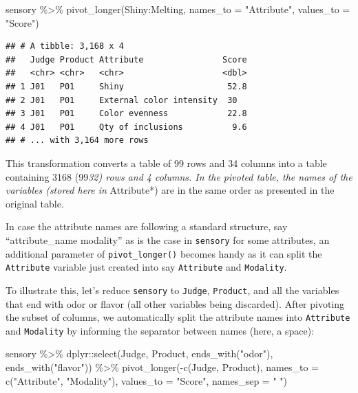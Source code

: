 \documentclass[
]{krantz}
\makeatletter
\newenvironment{Shaded}{\begin{snugshade}}{\end{snugshade}}
\newcommand{\AttributeTok}[1]{\textcolor[rgb]{0.61,0.61,0.61}{#1}}
\newcommand{\FunctionTok}[1]{\textcolor[rgb]{0,0,0}{#1}}
\newcommand{\NormalTok}[1]{#1}
\newcommand{\SpecialCharTok}[1]{\textcolor[rgb]{0,0,0}{#1}}
\newcommand{\StringTok}[1]{\textcolor[rgb]{0.5,0.5,0.5}{#1}}
\newenvironment{kframe}{%
\medskip{}
\setlength{\fboxsep}{.8em}
 \def\at@end@of@kframe{}%
 \ifinner\ifhmode%
  \def\at@end@of@kframe{\end{minipage}}%
  \begin{minipage}{\columnwidth}%
 \fi\fi%
 \def\FrameCommand##1{\hskip\@totalleftmargin \hskip-\fboxsep
 \colorbox{shadecolor}{##1}\hskip-\fboxsep
     \hskip-\linewidth \hskip-\@totalleftmargin \hskip\columnwidth}%
 \MakeFramed {\advance\hsize-\width
   \@totalleftmargin\z@ \linewidth\hsize
   \@setminipage}}%
 {\par\unskip\endMakeFramed%
 \at@end@of@kframe}
\renewenvironment{Shaded}{\begin{kframe}}{\end{kframe}}
\makeatother
\begin{document}
\begin{Shaded}
\begin{Highlighting}[]
\NormalTok{sensory }\SpecialCharTok{\%\textgreater{}\%}
  \FunctionTok{pivot\_longer}\NormalTok{(Shiny}\SpecialCharTok{:}\NormalTok{Melting, }
               \AttributeTok{names\_to =} \StringTok{"Attribute"}\NormalTok{, }\AttributeTok{values\_to =} \StringTok{"Score"}\NormalTok{)}
\end{Highlighting}
\end{Shaded}

\begin{verbatim}
## # A tibble: 3,168 x 4
##   Judge Product Attribute                Score
##   <chr> <chr>   <chr>                    <dbl>
## 1 J01   P01     Shiny                     52.8
## 2 J01   P01     External color intensity  30  
## 3 J01   P01     Color evenness            22.8
## 4 J01   P01     Qty of inclusions          9.6
## # ... with 3,164 more rows
\end{verbatim}

This transformation converts a table of 99 rows and 34 columns into a table containing 3168 (99\emph{32) rows and 4 columns.
In the pivoted table, the names of the variables (stored here in }Attribute*) are in the same order as presented in the original table.

In case the attribute names are following a standard structure, say ``attribute\_name modality'' as is the case in \texttt{sensory} for some attributes, an additional parameter of \texttt{pivot\_longer()} becomes handy as it can split the \texttt{Attribute} variable just created into say \texttt{Attribute} and \texttt{Modality}.

To illustrate this, let's reduce \texttt{sensory} to \texttt{Judge}, \texttt{Product}, and all the variables that end with odor or flavor (all other variables being discarded). After pivoting the subset of columns, we automatically split the attribute names into \texttt{Attribute} and \texttt{Modality} by informing the separator between names (here, a space):

\begin{Shaded}
\begin{Highlighting}[]
\NormalTok{sensory }\SpecialCharTok{\%\textgreater{}\%}
\NormalTok{  dplyr}\SpecialCharTok{::}\FunctionTok{select}\NormalTok{(Judge, Product, }
                \FunctionTok{ends\_with}\NormalTok{(}\StringTok{"odor"}\NormalTok{), }\FunctionTok{ends\_with}\NormalTok{(}\StringTok{"flavor"}\NormalTok{)) }\SpecialCharTok{\%\textgreater{}\%}
  \FunctionTok{pivot\_longer}\NormalTok{(}\SpecialCharTok{{-}}\FunctionTok{c}\NormalTok{(Judge, Product), }
               \AttributeTok{names\_to =} \FunctionTok{c}\NormalTok{(}\StringTok{"Attribute"}\NormalTok{, }\StringTok{"Modality"}\NormalTok{), }
               \AttributeTok{values\_to =} \StringTok{"Score"}\NormalTok{, }\AttributeTok{names\_sep =} \StringTok{" "}\NormalTok{)}
\end{Highlighting}
\end{Shaded}
\end{document}
